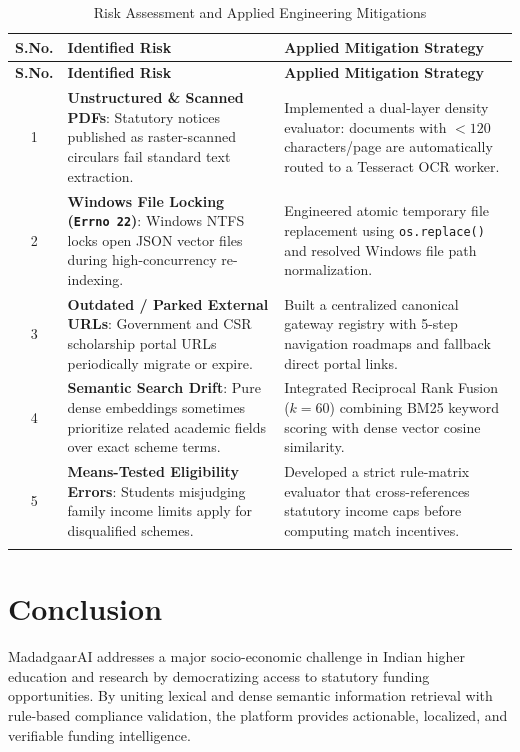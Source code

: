 \documentclass[12pt,a4paper]{article}
\begin{document}
\begin{longtable}{|c|p{6.0cm}|p{7.0cm}|}
    \hline
    \textbf{S.No.} & \textbf{Identified Risk} & \textbf{Applied Mitigation Strategy} \\
    \hline
    \endfirsthead
    
    \hline
    \textbf{S.No.} & \textbf{Identified Risk} & \textbf{Applied Mitigation Strategy} \\
    \hline
    \endhead
    
    1 & \textbf{Unstructured \& Scanned PDFs}: Statutory notices published as raster-scanned circulars fail standard text extraction. & Implemented a dual-layer density evaluator: documents with $<120$ characters/page are automatically routed to a Tesseract OCR worker. \\
    \hline
    
    2 & \textbf{Windows File Locking (\texttt{Errno 22})}: Windows NTFS locks open JSON vector files during high-concurrency re-indexing. & Engineered atomic temporary file replacement using \texttt{os.replace()} and resolved Windows file path normalization. \\
    \hline
    
    3 & \textbf{Outdated / Parked External URLs}: Government and CSR scholarship portal URLs periodically migrate or expire. & Built a centralized canonical gateway registry with 5-step navigation roadmaps and fallback direct portal links. \\
    \hline
    
    4 & \textbf{Semantic Search Drift}: Pure dense embeddings sometimes prioritize related academic fields over exact scheme terms. & Integrated Reciprocal Rank Fusion ($k=60$) combining BM25 keyword scoring with dense vector cosine similarity. \\
    \hline
    
    5 & \textbf{Means-Tested Eligibility Errors}: Students misjudging family income limits apply for disqualified schemes. & Developed a strict rule-matrix evaluator that cross-references statutory income caps before computing match incentives. \\
    \hline
    \caption{Risk Assessment and Applied Engineering Mitigations}
\end{longtable}

\section{Conclusion}
MadadgaarAI addresses a major socio-economic challenge in Indian higher education and research by democratizing access to statutory funding opportunities. By uniting lexical and dense semantic information retrieval with rule-based compliance validation, the platform provides actionable, localized, and verifiable funding intelligence. 
\end{document}
